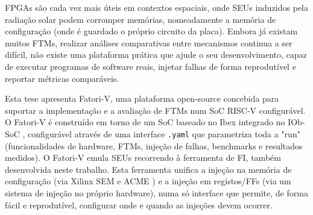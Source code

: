 \acresetall

\Acp{FPGA} são cada vez mais úteis em contextos espaciais, onde \acp{SEU} induzidos pela radiação solar podem corromper memórias, nomeadamente a memória de configuração (onde é guardado o próprio circuito da placa). Embora já existam muitos \acp{FTM}, realizar análises comparativas entre mecanismos continua a ser difícil, não existe uma plataforma prática que ajude o seu desenvolvimento, capaz de executar programas de software reais, injetar falhas de forma reprodutível e reportar métricas comparáveis.

Esta tese apresenta \ac{Fatori-V}, uma plataforma open-source concebida para suportar a implementação e a avaliação de \acp{FTM} num \ac{SoC} \ac{RISC-V} configurável. O \ac{Fatori-V} é construído em torno de um \ac{SoC} baseado no Ibex \cite{ibex} integrado no IOb-SoC \cite{iob-soc}, configurável através de uma interface \texttt{.yaml} que parametriza toda a "run" (funcionalidades de hardware, \acp{FTM}, injeção de falhas, benchmarks e resultados medidos). O \ac{Fatori-V} emula \acp{SEU} recorrendo à ferramenta de \ac{FI}, também desenvolvida neste trabalho. Esta ferramenta unifica a injeção na memória de configuração (via Xilinx \ac{SEM} e ACME \cite{SEM,ACME}) e a injeção em registos/\acp{FF} (via um sistema de injeção no próprio hardware), numa só interface que permite, de forma fácil e reprodutível, configurar onde e quando as injeções devem ocorrer.